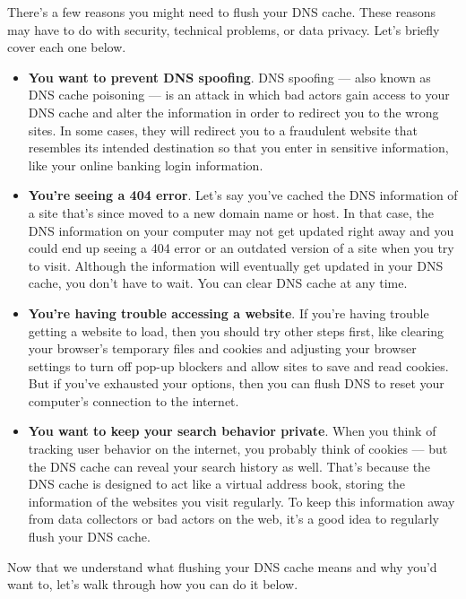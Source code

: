 \documentclass[a4paper,12pt]{article}
\begin{document}
There’s a few reasons you might need to flush your DNS cache. These reasons may have to do with security, technical problems, or data privacy. Let’s briefly cover each one below.

\begin{itemize}
\item{\textbf{You want to prevent DNS spoofing}.
DNS spoofing — also known as DNS cache poisoning — is an attack in which bad actors gain access to your DNS cache and alter the information in order to redirect you to the wrong sites. In some cases, they will redirect you to a fraudulent website that resembles its intended destination so that you enter in sensitive information, like your online banking login information.}

\item{\textbf{You’re seeing a 404 error}.
Let’s say you’ve cached the DNS information of a site that’s since moved to a new domain name or host. In that case, the DNS information on your computer may not get updated right away and you could end up seeing a 404 error or an outdated version of a site when you try to visit. Although the information will eventually get updated in your DNS cache, you don’t have to wait. You can clear DNS cache at any time.}

\item{\textbf{You’re having trouble accessing a website}.
If you’re having trouble getting a website to load, then you should try other steps first, like clearing your browser's temporary files and cookies and adjusting your browser settings to turn off pop-up blockers and allow sites to save and read cookies. But if you’ve exhausted your options, then you can flush DNS to reset your computer's connection to the internet.}

\item{\textbf{You want to keep your search behavior private}.
When you think of tracking user behavior on the internet, you probably think of cookies — but the DNS cache can reveal your search history as well. That’s because the DNS cache is designed to act like a virtual address book, storing the information of the websites you visit regularly. To keep this information away from data collectors or bad actors on the web, it’s a good idea to regularly flush your DNS cache.}
\end{itemize}
Now that we understand what flushing your DNS cache means and why you’d want to, let’s walk through how you can do it below.
\end{document}
